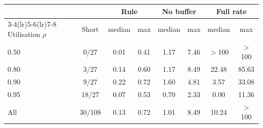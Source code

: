 \begin{tabular}{@{}lccccccc@{}}
\toprule
 & & \multicolumn{2}{c}{Rule} & \multicolumn{2}{c}{No buffer} & \multicolumn{2}{c}{Full rate} \\
\cmidrule(lr){3-4}\cmidrule(lr){5-6}\cmidrule(lr){7-8}
Utilisation $\rho$ & Short & median & max & median & max & median & max \\
\midrule
0.50 & 0/27 & 0.01 & 0.41 & 1.17 & 7.46 & $>$100 & $>$100 \\
0.80 & 3/27 & 0.14 & 0.60 & 1.17 & 8.49 & 22.48 & 85.63 \\
0.90 & 9/27 & 0.22 & 0.72 & 1.60 & 4.81 & 3.57 & 33.08 \\
0.95 & 18/27 & 0.07 & 0.53 & 0.70 & 2.33 & 0.00 & 11.36 \\
\midrule
All & 30/108 & 0.13 & 0.72 & 1.01 & 8.49 & 10.24 & $>$100 \\
\bottomrule
\end{tabular}
